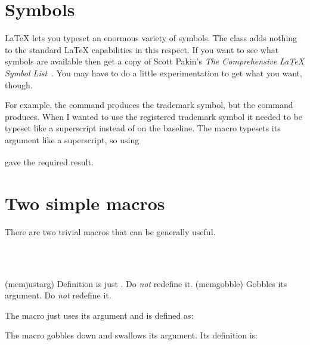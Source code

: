 \section{Symbols}

    LaTeX lets you typeset an enormous variety of symbols.
The class adds
nothing to the standard LaTeX capabilities in this respect.
If you want to see what symbols are available then get a copy
of Scott Pakin's 
\textit{The Comprehensive LaTeX Symbol List}~\cite{SYMBOLS}.
You may have to do a little experimentation to get what you want, though.

    For example, the \cmd{\texttrademark} command 
produces the trademark symbol\texttrademark,
but the \cmd{\textregistered} command produces\textregistered.
When I wanted to use the registered trademark
 symbol it needed to be 
typeset like a superscript
instead of on the baseline. The \cmd{\textsuperscipt} macro typesets
its argument like a superscript, so using
\begin{lcode}
\textsuperscript{\textregistered}
\end{lcode}
gave the required result\textsuperscript{\textregistered}.




\section{Two simple macros}

    There are two trivial macros that can be generally useful.
\begin{syntax}
\cmd{\memjustarg} \\
\cmd{\memgobble} \\
\end{syntax}
\glossary(memjustarg)%
  {}%
  {Definition is just . Do \emph{not} redefine it.}%
\glossary(memgobble)%
  {}%
  {Gobbles its argument. Do \emph{not} redefine it.}%

    The \cmd{\memjustarg} macro just uses its argument and is defined as:
\begin{lcode}
\newcommand*{\memjustarg}[1]{#1}
\end{lcode}

  The \cmd{\memgobble} macro gobbles down and swallows its argument. 
Its definition is:
\begin{lcode}
\newcommand{\memgobble}[1]{}
\end{lcode}

